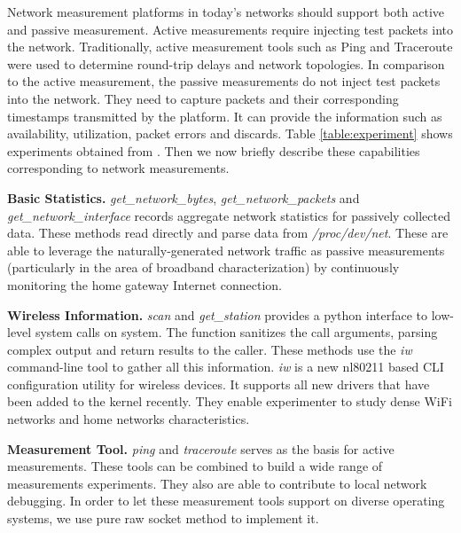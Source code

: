 Network measurement platforms in today's networks should support both active and passive measurement. Active measurements require injecting test packets into the network. Traditionally, active measurement tools such as Ping and Traceroute were used to determine round-trip delays and network topologies. In comparison to the active measurement, the passive measurements do not inject test packets into the network. They need to capture packets and their corresponding timestamps transmitted by the platform. It can provide the information such as availability, utilization, packet errors and discards\cite{calyamactive}. Table \ref{table:experiment} shows experiments obtained from \sysname. Then we now briefly describe these capabilities corresponding to network measurements.

\textbf{Basic Statistics.} \textit{get\_network\_bytes}, \textit{get\_network\_packets} and \textit{get\_network\_interface} records aggregate network statistics for passively collected data. These methods read directly and parse data from \emph{/proc/dev/net}. These are able to leverage the naturally-generated network traffic as passive measurements (particularly in the area of broadband characterization) by continuously monitoring the home gateway Internet connection.

\textbf{Wireless Information.} \textit{scan} and \textit{get\_station} provides a python interface to low-level system calls on system. The function sanitizes the call arguments, parsing complex output and return results to the caller. These methods use the \emph{iw} command-line tool to gather all this information. \emph{iw} is a new nl80211 based CLI configuration utility for wireless devices. It supports all new drivers that have been added to the kernel recently.\cite{iw} They enable experimenter to study dense WiFi networks and home networks characteristics.

\textbf{Measurement Tool.} \textit{ping} and \textit{traceroute} serves as the basis for active measurements. These tools can be combined to build a wide range of measurements experiments. They also are able to contribute to local network debugging. In order to let these measurement tools support on diverse operating systems, we use pure raw socket method to implement it. 


